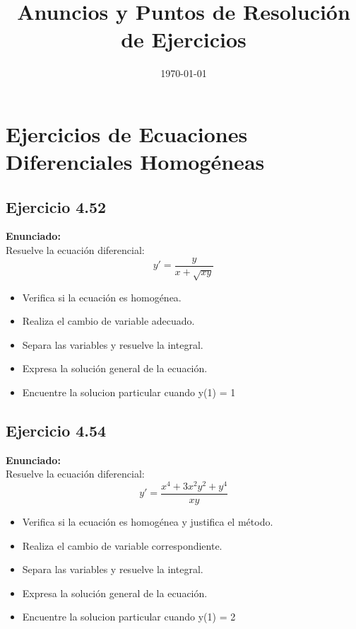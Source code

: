 \documentclass[12pt,a4paper]{article}
\title{Anuncios y Puntos de Resolución de Ejercicios}
\author{}
\date{\today}
\begin{document}
\maketitle


\section*{Ejercicios de Ecuaciones Diferenciales Homogéneas}

\subsection*{Ejercicio 4.52}
\textbf{Enunciado:}
\\
Resuelve la ecuación diferencial:
\[
y' = \frac{y}{x + \sqrt{xy}}
\]
\begin{itemize}[leftmargin=2em]
    \item Verifica si la ecuación es homogénea.
    \item Realiza el cambio de variable adecuado.
    \item Separa las variables y resuelve la integral.
    \item Expresa la solución general de la 
    ecuación.
    \item Encuentre la solucion particular cuando y(1) = 1
\end{itemize}

\subsection*{Ejercicio 4.54}
\textbf{Enunciado:}
\\
Resuelve la ecuación diferencial:
\[
y' = \frac{x^4 + 3x^2y^2 + y^4}{xy}
\]
\begin{itemize}[leftmargin=2em]
    \item Verifica si la ecuación es homogénea y justifica el método.
    \item Realiza el cambio de variable correspondiente.
    \item Separa las variables y resuelve la integral.
    \item Expresa la solución general de la ecuación.
    \item Encuentre la solucion particular cuando y(1) = 2
\end{itemize}

\end{document}
